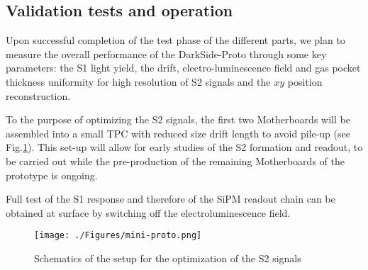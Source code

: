\subsection{Validation tests and operation}
Upon successful completion of the test phase of the different parts, we plan to measure the overall performance of the DarkSide-Proto through some key parameters: the S1 light yield, the drift, electro-luminescence field and gas pocket thickness uniformity for high resolution of S2 signals and the $x y$ position reconstruction. 

To the purpose of optimizing the S2 signals, the first two Motherboards will be assembled into a small TPC with reduced size drift length to avoid pile-up (see Fig.\ref{fig:mini-proto}). 
This set-up will allow for early studies of the S2 formation and readout, to be carried out while the pre-production of the remaining Motherboards of the prototype is ongoing.

Full test of the S1 response and therefore of the SiPM readout chain can be obtained at surface by switching off the electroluminescence field. 
\begin{figure}[h!]
\centering
\texttt{[image: ./Figures/mini-proto.png]}
\caption{Schematics   of  the setup for the optimization of  the S2 signals}
\label{fig:mini-proto}
\end{figure}